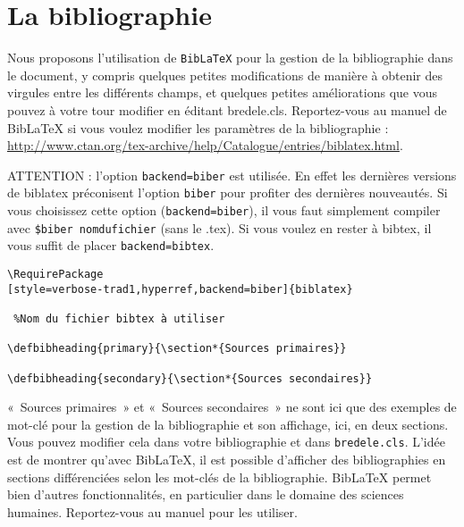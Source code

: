 \documentclass[10pt,a4paper]{article}
\begin{document}
\newpage
\section{La bibliographie}
Nous proposons l'utilisation de \verb!BibLaTeX! pour la gestion de la bibliographie dans le document, y compris quelques petites modifications de manière à obtenir des virgules entre les différents champs, et quelques petites améliorations que vous pouvez à votre tour modifier en éditant bredele.cls. Reportez-vous au manuel de BibLaTeX si vous voulez modifier les paramètres de la bibliographie : \url{http://www.ctan.org/tex-archive/help/Catalogue/entries/biblatex.html}.

ATTENTION : l'option \verb!backend=biber! est utilisée. En effet les dernières versions de biblatex préconisent l'option \verb!biber! pour profiter des dernières nouveautés. Si vous choisissez cette option (\verb!backend=biber!), il vous faut simplement compiler avec \verb!$biber nomdufichier! (sans le .tex). Si vous voulez en rester à bibtex, il vous suffit de placer \verb!backend=bibtex!.

\begin{Verbatim}[frame=single, framerule=0.2mm, rulecolor=\color{gray}, label=Réglage de la bibliographie dans le .cls]
\RequirePackage
[style=verbose-trad1,hyperref,backend=biber]{biblatex}

 %Nom du fichier bibtex à utiliser

\defbibheading{primary}{\section*{Sources primaires}}

\defbibheading{secondary}{\section*{Sources secondaires}}

\end{Verbatim}

«~Sources primaires~» et «~Sources secondaires~» ne sont ici que des exemples de mot-clé pour la gestion de la bibliographie et son affichage, ici, en deux sections. Vous pouvez modifier cela dans votre bibliographie et dans \verb!bredele.cls!. L'idée est de montrer qu'avec BibLaTeX, il est possible d'afficher des bibliographies en sections différenciées selon les mot-clés de la bibliographie. BibLaTeX permet bien d'autres fonctionnalités, en particulier dans le domaine des sciences humaines. Reportez-vous au manuel pour les utiliser.
\end{document}
